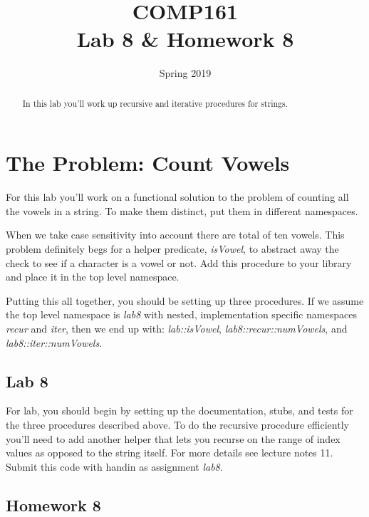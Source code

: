 \documentclass[nobib]{tufte-handout}
\title{COMP161 \\ Lab 8 \& Homework 8}
\author{}
\date{Spring 2019}
\begin{document}
\maketitle

\begin{abstract}
In this lab you'll work up recursive and iterative procedures for strings.
\end{abstract}

\section{The Problem: Count Vowels}

For this lab you'll work on a functional solution to the problem of counting all the vowels in a string. To make them distinct, put them in different namespaces.

When we take case sensitivity into account there are total of ten vowels. This problem definitely begs for a helper predicate, \textit{isVowel}, to abstract away the check to see if a character is a vowel or not.  Add this procedure to your library and place it in the top level namespace.

Putting this all together, you should be setting up three procedures. If we assume the top level namespace is \textit{lab8} with nested, implementation specific namespaces \textit{recur} and \textit{iter}, then we end up with: \textit{lab::isVowel}, \textit{lab8::recur::numVowels}, and \textit{lab8::iter::numVowels}.

\subsection*{Lab 8}

For lab, you should begin by setting up the documentation, stubs, and tests for the three procedures described above.  To do the recursive procedure efficiently you'll need to add another helper that lets you recurse on the range of index values as opposed to the string itself. For more details see lecture notes 11. Submit this code with handin as assignment \textit{lab8}.

\subsection*{Homework 8}
\end{document}
